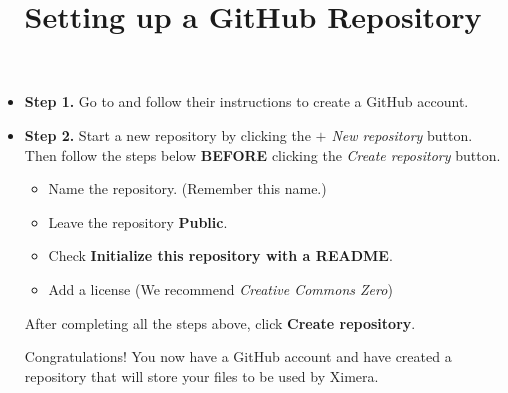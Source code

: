 \documentclass{ximera}
\title{Setting up a GitHub Repository}
\begin{document}

\maketitle


\begin{itemize}

\item\textbf{Step 1.} Go to  and follow their instructions to create a GitHub account. 

\item\textbf{Step 2.} Start a new repository by clicking the \emph{$+$ New repository} button. 
Then follow the steps below \textbf{BEFORE} clicking the \emph{Create repository} button.

\begin{itemize}

\item Name the repository. (Remember this name.)
\item Leave the repository \textbf{Public}.
\item Check \textbf{Initialize this repository with a README}.
\item Add a license (We recommend \emph{Creative Commons Zero})

\end{itemize}

After completing all the steps above, click \textbf{Create repository}.

Congratulations! You now have a GitHub account and have created a repository that will store your files to be used by Ximera.

\end{itemize}
\end{document}

